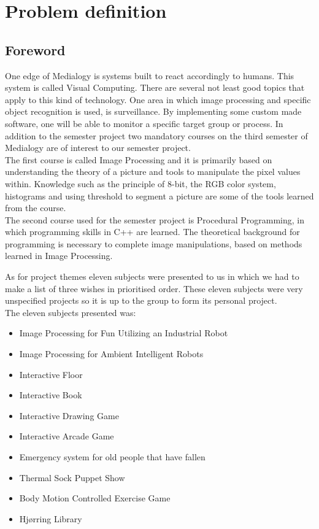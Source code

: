 \chapter{Problem definition}
\section{Foreword}
One edge of Medialogy is systems built to react accordingly to humans. This system is called Visual Computing. There are several not least good topics that apply to this kind of technology. One area in which image processing and specific object recognition is used, is surveillance. By implementing some custom made software, one will be able to monitor a specific target group or process. In addition to the semester project two mandatory courses on the third semester of Medialogy are of interest to our semester project.\\
The first course is called Image Processing and it is primarily based on understanding the theory of a picture and tools to manipulate the pixel values within. Knowledge such as the principle of 8-bit, the RGB color system, histograms and using threshold to segment a picture are some of the tools learned from the course.\\
The second course used for the semester project is Procedural Programming, in which programming skills in C++ are learned. The theoretical background for programming is necessary to complete image manipulations, based on methods learned in Image Processing.

As for project themes eleven subjects were presented to us in which we had to make a list of three wishes in prioritised order. These eleven subjects were very unspecified projects so it is up to the group to form its personal project. \\
The eleven subjects presented was:

\begin{itemize}
\item Image Processing for Fun Utilizing an Industrial Robot
\item Image Processing for Ambient Intelligent Robots
\item Interactive Floor
\item Interactive Book
\item Interactive Drawing Game
\item Interactive Arcade Game
\item Emergency system for old people that have fallen
\item Thermal Sock Puppet Show
\item Body Motion Controlled Exercise Game
\item Hj{\o}rring Library
\end{itemize}

